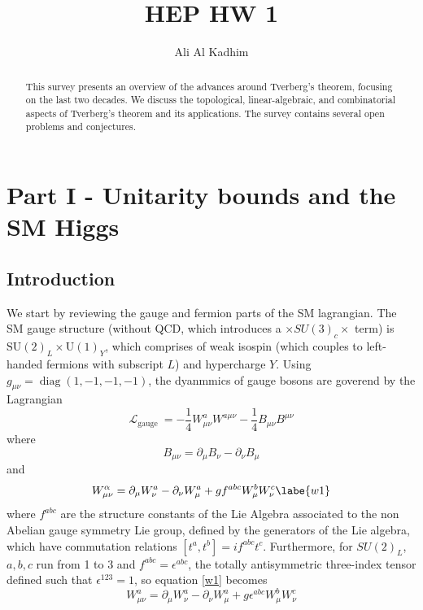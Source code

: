 \documentclass[11pt]{article}
\title{HEP HW 1}
\author{Ali Al Kadhim}
\date{}
\begin{document}
\maketitle

\begin{abstract}
This survey presents an overview of the advances around Tverberg's theorem, focusing on the last two decades.  We discuss the topological, linear-algebraic, and combinatorial aspects of Tverberg's theorem and its applications.  The survey contains several open problems and conjectures.
\end{abstract}

\section{Part I - Unitarity bounds and the SM Higgs}
\subsection{Introduction}
We start by reviewing the gauge and fermion parts of the SM lagrangian. The SM gauge structure (without QCD, which introduces a $\times SU(3)_c \times$ term) is $\mathrm{SU}(2)_{L} \times \mathrm{U}(1)_{Y}$, which comprises of weak isospin (which couples to left-handed fermions with subscript $L$) and hypercharge $Y$. Using $g_{\mu \nu}=\operatorname{diag}(1,-1,-1,-1)$, the dyanmmics of gauge bosons are goverend by the Lagrangian
\begin{equation}
    \mathcal{L}_{\text {gauge }}=-\frac{1}{4} W_{\mu \nu}^{a} W^{a \mu \nu}-\frac{1}{4} B_{\mu \nu} B^{\mu \nu}
\end{equation}
where 
\begin{equation}
    B_{\mu \nu}=\partial_{\mu} B_{\nu}-\partial_{\nu} B_{\mu}
\end{equation}
and
\begin{equation}
    W_{\mu \nu}^{\alpha}=\partial_{\mu} W_{\nu}^{a}-\partial_{\nu} W_{\mu}^{a}+g f^{a b c} W_{\mu}^{b} W_{\nu}^{c}
    \labe{w1}
\end{equation}
where $f^{abc}$ are the structure constants of  the Lie Algebra associated to the non Abelian gauge symmetry Lie group, defined by the generators of the Lie algebra, which have commutation relations   $\left[t^{a}, t^{b}\right]=i f^{a b c} t^{c}$. Furthermore, for $SU(2)_L$, $a,b, c$ run from 1 to 3 and $f^{abc} =\epsilon^{abc}$, the totally antisymmetric three-index tensor defined such that $\epsilon^{123}=1$, so equation \ref{w1} becomes
\begin{equation}
    W_{\mu \nu}^{a}=\partial_{\mu} W_{\nu}^{a}-\partial_{\nu} W_{\mu}^{a}+g \epsilon^{a b c} W_{\mu}^{b} W_{\nu}^{c}
\end{equation}
\end{document}
